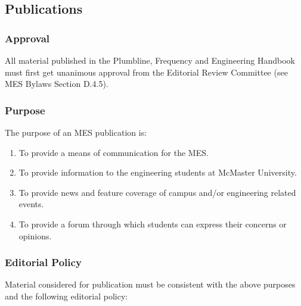 \hypertarget{publications}{%
 \subsection{Publications}
 \label{publications}}

\hypertarget{approval}{%
 \subsubsection{Approval}
 \label{approval}}
All material published in the Plumbline, Frequency and Engineering
Handbook must first get unanimous approval from the Editorial Review
Committee (see MES Bylaws Section D.4.5).

\hypertarget{purpose}{%
 \subsubsection{Purpose}
 \label{purpose}}

The purpose of an MES publication is:

\begin{enumerate}
 \item
  To provide a means of communication for the MES.
 \item
  To provide information to the engineering students at McMaster
  University.
 \item
  To provide news and feature coverage of campus and/or engineering
  related events.
 \item
  To provide a forum through which students can express their concerns
  or opinions.

\end{enumerate}

\hypertarget{editorial-policy}{%
 \subsubsection{Editorial Policy}
 \label{editorial-policy}}
Material considered for publication must be consistent with the above
purposes and the following editorial policy:


